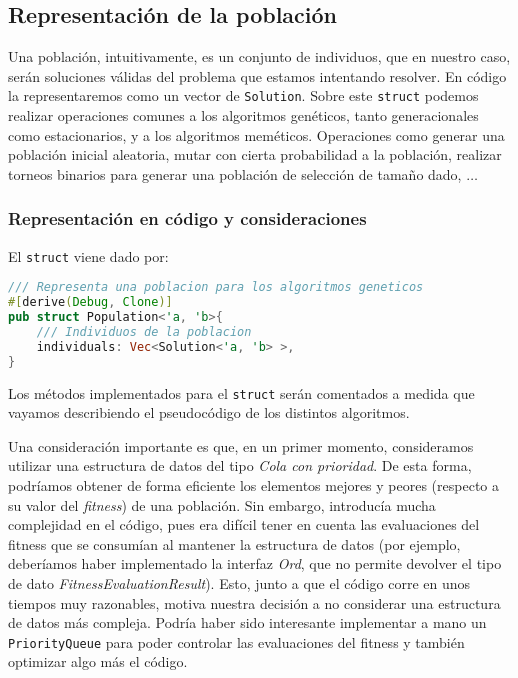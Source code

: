 \documentclass[11pt]{article}
\begin{document}
\subsection{Representación de la población}

Una población, intuitivamente, es un conjunto de individuos, que en nuestro caso, serán soluciones válidas del problema que estamos intentando resolver. En código la representaremos como un vector de \lstinline{Solution}. Sobre este \lstinline{struct} podemos realizar operaciones comunes a los algoritmos genéticos, tanto generacionales como estacionarios, y a los algoritmos meméticos. Operaciones como generar una población inicial aleatoria, mutar con cierta probabilidad a la población, realizar  torneos binarios para generar una población de selección de tamaño dado, $\ldots$

\subsubsection{Representación en código y consideraciones}

El \lstinline{struct} viene dado por:

\begin{lstlisting}[language=Rust, style=Boxed, basicstyle=\small]
/// Representa una poblacion para los algoritmos geneticos
#[derive(Debug, Clone)]
pub struct Population<'a, 'b>{
    /// Individuos de la poblacion
    individuals: Vec<Solution<'a, 'b> >,
}
\end{lstlisting}

Los métodos implementados para el \lstinline{struct} serán comentados a medida que vayamos describiendo el pseudocódigo de los distintos algoritmos.

Una consideración importante es que, en un primer momento, consideramos utilizar una estructura de datos del tipo \emph{Cola con prioridad}. De esta forma, podríamos obtener de forma eficiente los elementos mejores y peores (respecto a su valor del \emph{fitness}) de una población. Sin embargo, introducía mucha complejidad en el código, pues era difícil tener en cuenta las evaluaciones del fitness que se consumían al mantener la estructura de datos (por ejemplo, deberíamos haber implementado la interfaz \emph{Ord}, que no permite devolver el tipo de dato \emph{FitnessEvaluationResult}). Esto, junto a que el código corre en unos tiempos muy razonables, motiva nuestra decisión a no considerar una estructura de datos más compleja. Podría haber sido interesante implementar a mano un \lstinline{PriorityQueue} para poder controlar las evaluaciones del fitness y también optimizar algo más el código.
\end{document}
